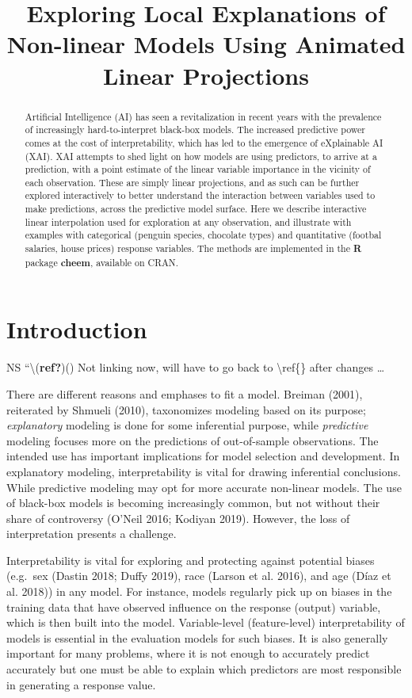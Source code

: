 \documentclass[
]{article}
\title{Exploring Local Explanations of Non-linear Models Using Animated
Linear Projections}
\author{}
\date{\vspace{-2.5em}}
\begin{document}
\maketitle
\begin{abstract}
Artificial Intelligence (AI) has seen a revitalization in recent years
with the prevalence of increasingly hard-to-interpret black-box models.
The increased predictive power comes at the cost of interpretability,
which has led to the emergence of eXplainable AI (XAI). XAI attempts to
shed light on how models are using predictors, to arrive at a
prediction, with a point estimate of the linear variable importance in
the vicinity of each observation. These are simply linear projections,
and as such can be further explored interactively to better understand
the interaction between variables used to make predictions, across the
predictive model surface. Here we describe interactive linear
interpolation used for exploration at any observation, and illustrate
with examples with categorical (penguin species, chocolate types) and
quantitative (footbal salaries, house prices) response variables. The
methods are implemented in the \textbf{R} package \textbf{cheem},
available on CRAN.
\end{abstract}

\hypertarget{sec:intro}{%
\section{Introduction}\label{sec:intro}}

NS ``\textbackslash{}(\textbf{ref?})() Not linking now, will have to go
back to \textbackslash ref\{\} after changes \ldots{}

There are different reasons and emphases to fit a model. Breiman (2001),
reiterated by Shmueli (2010), taxonomizes modeling based on its purpose;
\emph{explanatory} modeling is done for some inferential purpose, while
\emph{predictive} modeling focuses more on the predictions of
out-of-sample observations. The intended use has important implications
for model selection and development. In explanatory modeling,
interpretability is vital for drawing inferential conclusions. While
predictive modeling may opt for more accurate non-linear models. The use
of black-box models is becoming increasingly common, but not without
their share of controversy (O'Neil 2016; Kodiyan 2019). However, the
loss of interpretation presents a challenge.

Interpretability is vital for exploring and protecting against potential
biases (e.g.~sex (Dastin 2018; Duffy 2019), race (Larson et al. 2016),
and age (Díaz et al. 2018)) in any model. For instance, models regularly
pick up on biases in the training data that have observed influence on
the response (output) variable, which is then built into the model.
Variable-level (feature-level) interpretability of models is essential
in the evaluation models for such biases. It is also generally important
for many problems, where it is not enough to accurately predict
accurately but one must be able to explain which predictors are most
responsible in generating a response value.
\end{document}
